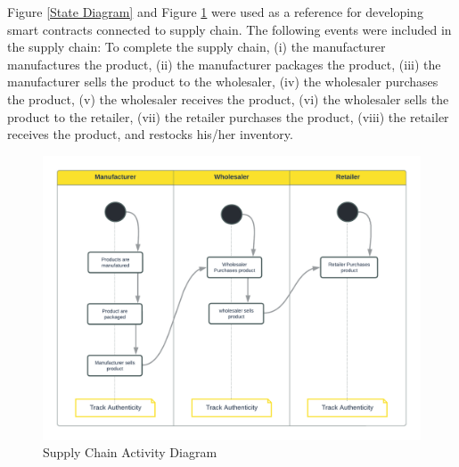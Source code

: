 \begin{table}[h]
\small
\centering
\caption{Package Version}
\label{Package Version}
\end{table}

\vspace{.5cm}

Figure \ref{State Diagram} and Figure \ref{Activity Diagram} were used as a reference for developing smart contracts connected to supply chain. The following events were included in the supply chain: To complete the supply chain, (i) the manufacturer manufactures the product, (ii) the manufacturer packages the product, (iii) the manufacturer sells the product to the wholesaler, (iv) the wholesaler purchases the product, (v) the wholesaler receives the product, (vi) the wholesaler sells the product to the retailer, (vii) the retailer purchases the product, (viii) the retailer receives the product, and restocks his/her inventory.

\begin{figure}[h]
\centering
  \includegraphics[width=12cm]{includes/figures/Activity Diagram.png} 
  \caption{Supply Chain Activity Diagram}
  \label{Activity Diagram}
\end{figure}

